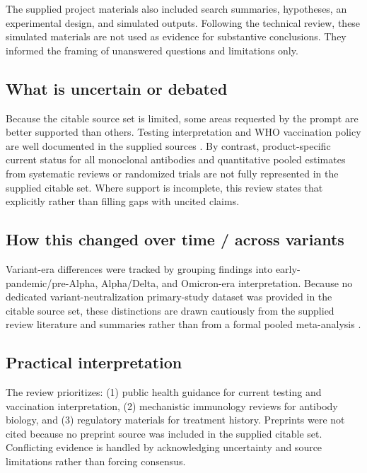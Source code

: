 \documentclass[12pt]{article}
\begin{document}
The supplied project materials also included search summaries, hypotheses, an experimental design, and simulated outputs. Following the technical review, these simulated materials are not used as evidence for substantive conclusions. They informed the framing of unanswered questions and limitations only.

\subsection*{What is uncertain or debated}
Because the citable source set is limited, some areas requested by the prompt are better supported than others. Testing interpretation and WHO vaccination policy are well documented in the supplied sources \cite{ref1,ref8,ref9,ref10,ref11,ref12}. By contrast, product-specific current status for all monoclonal antibodies and quantitative pooled estimates from systematic reviews or randomized trials are not fully represented in the supplied citable set. Where support is incomplete, this review states that explicitly rather than filling gaps with uncited claims.

\subsection*{How this changed over time / across variants}
Variant-era differences were tracked by grouping findings into early-pandemic/pre-Alpha, Alpha/Delta, and Omicron-era interpretation. Because no dedicated variant-neutralization primary-study dataset was provided in the citable source set, these distinctions are drawn cautiously from the supplied review literature and summaries rather than from a formal pooled meta-analysis \cite{ref3,ref5}.

\subsection*{Practical interpretation}
The review prioritizes: (1) public health guidance for current testing and vaccination interpretation, (2) mechanistic immunology reviews for antibody biology, and (3) regulatory materials for treatment history. Preprints were not cited because no preprint source was included in the supplied citable set. Conflicting evidence is handled by acknowledging uncertainty and source limitations rather than forcing consensus.
\end{document}
